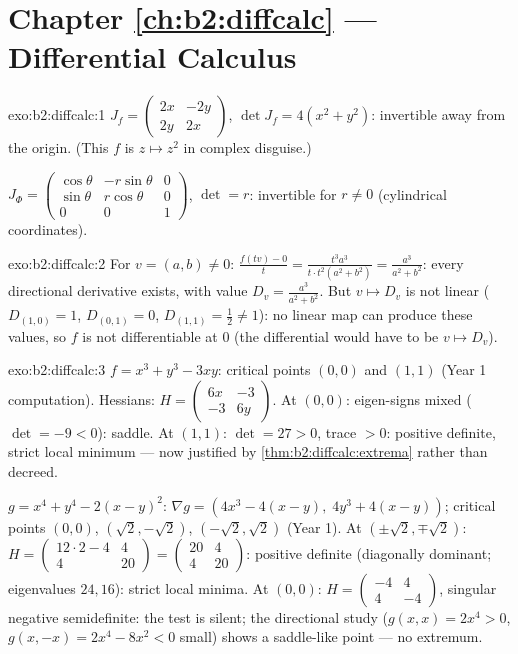\section*{Chapter \ref{ch:b2:diffcalc} --- Differential Calculus}

\begin{solution}{exo:b2:diffcalc:1}
$J_f = \begin{pmatrix} 2x & -2y\\ 2y & 2x\end{pmatrix}$, $\det J_f
= 4(x^2 + y^2)$: invertible away from the origin. (This $f$ is $z
\mapsto z^2$ in complex disguise.)

$J_\Phi = \begin{pmatrix} \cos\theta & -r\sin\theta & 0\\
\sin\theta & r\cos\theta & 0\\ 0 & 0 & 1\end{pmatrix}$, $\det = r$:
invertible for $r \neq 0$ (cylindrical coordinates).
\end{solution}

\begin{solution}{exo:b2:diffcalc:2}
For $v = (a, b) \neq 0$: $\frac{f(tv) - 0}{t} = \frac{t^3a^3}{t\cdot
t^2(a^2+b^2)} = \frac{a^3}{a^2 + b^2}$: every directional
derivative exists, with value $D_v = \frac{a^3}{a^2+b^2}$. But $v
\mapsto D_v$ is not linear ($D_{(1,0)} = 1$, $D_{(0,1)} = 0$,
$D_{(1,1)} = \frac12 \neq 1$): no linear map can produce these
values, so $f$ is not differentiable at $0$ (the differential would
have to be $v \mapsto D_v$).
\end{solution}

\begin{solution}{exo:b2:diffcalc:3}
$f = x^3 + y^3 - 3xy$: critical points $(0,0)$ and $(1,1)$ (Year 1
computation). Hessians: $H = \begin{pmatrix} 6x & -3\\ -3 &
6y\end{pmatrix}$. At $(0,0)$: eigen-signs mixed ($\det = -9 < 0$):
saddle. At $(1,1)$: $\det = 27 > 0$, trace $> 0$: positive
definite, strict local minimum --- now justified by
\cref{thm:b2:diffcalc:extrema} rather than decreed.

$g = x^4 + y^4 - 2(x-y)^2$: $\nabla g = (4x^3 - 4(x - y),\; 4y^3 +
4(x-y))$; critical points $(0,0)$, $(\sqrt2, -\sqrt2)$,
$(-\sqrt2, \sqrt2)$ (Year 1). At $(\pm\sqrt2, \mp\sqrt2)$: $H =
\begin{pmatrix} 12\cdot2 - 4 & 4\\ 4 & 20\end{pmatrix} =
\begin{pmatrix} 20 & 4\\ 4 & 20\end{pmatrix}$: positive definite
(diagonally dominant; eigenvalues $24, 16$): strict local minima.
At $(0,0)$: $H = \begin{pmatrix} -4 & 4\\ 4 & -4\end{pmatrix}$,
singular negative semidefinite: the test is silent; the directional
study ($g(x,x) = 2x^4 > 0$, $g(x,-x) = 2x^4 - 8x^2 < 0$ small)
shows a saddle-like point --- no extremum.
\end{solution}

